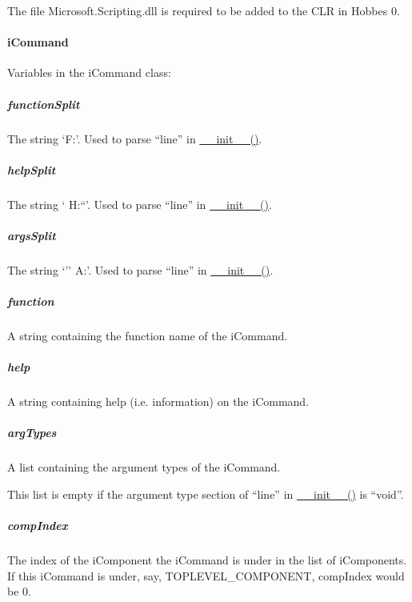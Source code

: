 \documentclass[12pt,letterpaper]{article}
\begin{document}
The file Microsoft.Scripting.dll is required to be added to the CLR in Hobbes 0.

\setcounter{paragraph}{-1}



%
%
\paragraph{iCommand}
\label{4.5.2.0}

Variables in the iCommand class:

\setcounter{subparagraph}{-1}



%
%
\subparagraph{functionSplit}
\label{4.5.2.0.0}

The string `F:'. Used to parse ``line'' in \hyperref[4.5.1.0.0]{\_\_init\_\_()}.



%
%
\subparagraph{helpSplit}
\label{4.5.2.0.1}

The string ` H:``'. Used to parse ``line'' in \hyperref[4.5.1.0.0]{\_\_init\_\_()}.



%
%
\subparagraph{argsSplit}
\label{4.5.2.0.2}

The string `'' A:'. Used to parse ``line'' in \hyperref[4.5.1.0.0]{\_\_init\_\_()}.



%
%
\subparagraph{function}
\label{4.5.2.0.3}

A string containing the function name of the iCommand.



%
%
\subparagraph{help}
\label{4.5.2.0.4}

A string containing help (i.e. information) on the iCommand.



%
%
\subparagraph{argTypes}
\label{4.5.2.0.5}

A list containing the argument types of the iCommand.

This list is empty if the argument type section of ``line'' in \hyperref[4.5.1.0.0]{\_\_init\_\_()} is ``void''.



%
%
\subparagraph{compIndex}
\label{4.5.2.0.6}

The index of the iComponent the iCommand is under in the list of iComponents. If this iCommand is under, say, TOPLEVEL\_COMPONENT, compIndex would be 0.
\end{document}
